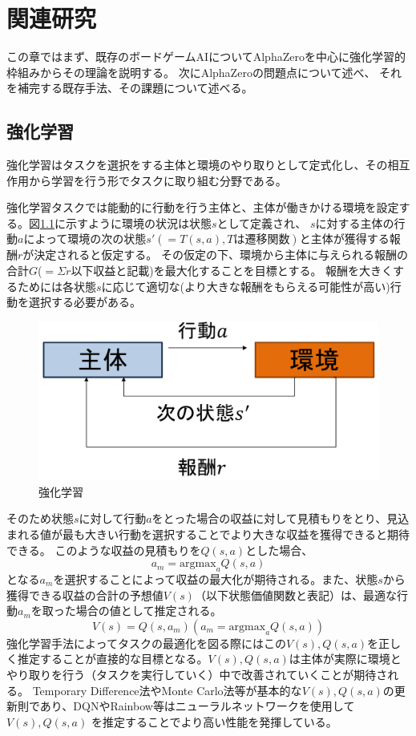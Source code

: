 \chapter{関連研究}
この章ではまず、既存のボードゲームAIについてAlphaZeroを中心に強化学習的枠組みからその理論を説明する。
次にAlphaZeroの問題点について述べ、
それを補完する既存手法、その課題について述べる。



\section{強化学習}
強化学習はタスクを選択をする主体と環境のやり取りとして定式化し、その相互作用から学習を行う形でタスクに取り組む分野である\cite{RL}。

強化学習タスクでは能動的に行動を行う主体と、主体が働きかける環境を設定する。図\ref{fig:RL}に示すように環境の状況は状態$s$として定義され、
$s$に対する主体の行動$a$によって環境の次の状態${s'}(=T(s, a), Tは遷移関数)$と主体が獲得する報酬$r$が決定されると仮定する。
その仮定の下、環境から主体に与えられる報酬の合計$G$($=\Sigma r$以下収益と記載)を最大化することを目標とする。
報酬を大きくするためには各状態$s$に応じて適切な(より大きな報酬をもらえる可能性が高い)行動を選択する必要がある。
\begin{figure}[t]
	\centering
	\includegraphics[width=\linewidth]{./figure/RL.png}
	\caption{強化学習}
	\label{fig:RL}
\end{figure}
そのため状態$s$に対して行動$a$をとった場合の収益に対して見積もりをとり、見込まれる値が最も大きい行動を選択することでより大きな収益を獲得できると期待できる。
このような収益の見積もりを$Q(s, a)$とした場合、
\begin{equation}
	{\displaystyle a_m = {\textrm{argmax}}_{a} Q(s, a)}
\end{equation}
となる$a_m$を選択することによって収益の最大化が期待される。また、状態$s$から獲得できる収益の合計の予想値$V(s)$（以下状態価値関数と表記）は、最適な行動$a_m$を取った場合の値として推定される。
\begin{equation}
	{\displaystyle V(s) = Q(s, a_m)(a_m = \textrm{argmax}_{a} Q(s, a))}
\end{equation}
強化学習手法によってタスクの最適化を図る際にはこの$V(s),Q(s, a)$を正しく推定することが直接的な目標となる。$V(s),Q(s, a)$は主体が実際に環境とやり取りを行う（タスクを実行していく）中で改善されていくことが期待される。
Temporary Difference法やMonte Carlo法等が基本的な$V(s),Q(s, a)$の更新則であり、DQN\cite{DQN}やRainbow\cite{rainbow}等はニューラルネットワークを使用して$V(s),Q(s, a)$
を推定することでより高い性能を発揮している。



